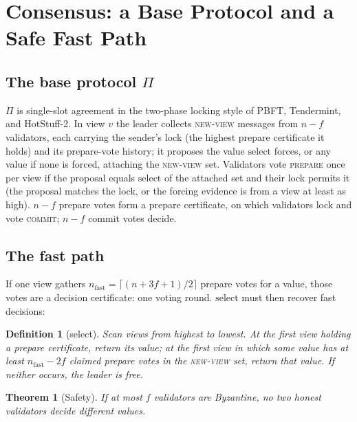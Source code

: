 \documentclass[journal]{IEEEtran}
\newtheorem{theorem}{Theorem}
\newtheorem{definition}{Definition}
\newcommand{\nf}{\ensuremath{n_{\mathrm{fast}}}}
\begin{document}
\section{Consensus: a Base Protocol and a Safe Fast Path}
\label{sec:consensus}

\subsection{The base protocol $\Pi$}

$\Pi$ is single-slot agreement in the two-phase locking style of PBFT,
Tendermint, and HotStuff-2. In view $v$ the leader collects
\textsc{new-view} messages from $n - f$ validators, each carrying the
sender's lock (the highest prepare certificate it holds) and its
prepare-vote history; it proposes the value $\mathrm{select}$ forces, or
any value if none is forced, attaching the \textsc{new-view} set.
Validators vote \textsc{prepare} once per view if the proposal equals
$\mathrm{select}$ of the attached set and their lock permits it (the
proposal matches the lock, or the forcing evidence is from a view at
least as high). $n - f$ prepare votes form a prepare certificate, on
which validators lock and vote \textsc{commit}; $n - f$ commit votes
decide.

\subsection{The fast path}

If one view gathers $\nf = \lceil (n + 3f + 1)/2 \rceil$ prepare votes
for a value, those votes are a decision certificate: one voting round.
$\mathrm{select}$ must then recover fast decisions:

\begin{definition}[select]
Scan views from highest to lowest. At the first view holding a prepare
certificate, return its value; at the first view in which some value has
at least $\nf - 2f$ claimed prepare votes in the \textsc{new-view} set,
return that value. If neither occurs, the leader is free.
\end{definition}

\begin{theorem}[Safety]
\label{thm:safety}
If at most $f$ validators are Byzantine, no two honest validators decide
different values.
\end{theorem}
\end{document}
